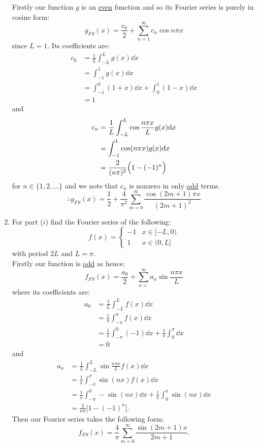 \begin{enumerate}
    Firstly our function $g$ is an \underline{even} function
    and so its Fourier series is purely in cosine form:
    $$g_{FS}(x)=\frac{c_0}{2}+\sum_{n=1}^{\infty}c_n\cos n\pi x$$
    since $L=1$. Its coefficients are:
    \begin{align*}
        c_0
        &=\frac{1}{L}\int_{-L}^{L}g(x)\dd x \\
        &=\int_{-1}^{1}g(x)\dd x \\
        &=\int_{-1}^{0}(1+x)\dd x
        +\int_{0}^{1}(1-x)\dd x \\
        &=1
    \end{align*}
    and
    \begin{align*}
        c_n
        &=\frac{1}{L}\int_{-L}^{L}\cos\frac{n\pi x}{L}g(x)\dd x \\
        &=\int_{-1}^{1}\cos(n\pi x)g(x)\dd x \\
        &=\frac{2}{(n\pi)^2}\Bigl(1-(-1)^n\Bigr)
    \end{align*}
    for $n\in\{1,2,\dots\}$ and we note that $c_n$ is nonzero in only \underline{odd} terms.
    $$\therefore g_{FS}(x)=\frac{1}{2}+
    \frac{4}{\pi^2}\sum_{m=0}^{\infty}
    \frac{\cos(2m+1)\pi x}{(2m+1)^2}$$

    \newpage

    \item For part ($i$) find the Fourier series of the following:
    $$f(x)=
    \left\{
    \begin{array}{ll}
        -1  & \mbox{} x\in[-L,0) \\
        1 & \mbox{} x\in(0,L]
    \end{array}
    \right.$$
    with period $2L$ and $L=\pi$. \\

    Firstly our function is \underline{odd} as hence:
    $$f_{FS}(x)=\frac{a_0}{2}+\sum_{n=}^{\infty}
    a_n\sin\frac{n\pi x}{L}$$
    where its coefficients are:
    \begin{align*}
        a_0
        &=\frac{1}{L}\int_{-L}^{L}f(x)\dd x \\
        &=\frac{1}{\pi}\int_{-\pi}^{\pi}f(x)\dd x \\
        &=\frac{1}{\pi}\int_{-\pi}^{0}(-1)\dd x
        +\frac{1}{\pi}\int_{0}^{\pi}\dd x \\
        &=0
    \end{align*}
    and
    \begin{align*}
        a_n
        &=\frac{1}{L}\int_{-L}^{L}\sin\frac{n\pi x}{L}f(x)\dd x \\
        &=\frac{1}{\pi}\int_{-\pi}^{\pi}\sin(nx)f(x)\dd x \\
        &=\frac{1}{\pi}\int_{-\pi}^{0}-\sin(nx)\dd x
        +\frac{1}{\pi}\int_{0}^{\pi}\sin(nx)\dd x \\
        &=\frac{2}{n\pi}\bigl[1-(-1)^n\bigr].
    \end{align*}
    Then our Fourier series takes the following form:
    $$f_{FS}(x)=\frac{4}{\pi}\sum_{m=0}^{\infty}
    \frac{\sin(2m+1)x}{2m+1}.$$


\end{enumerate}
